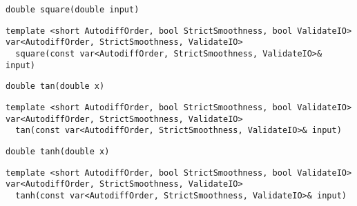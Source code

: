 \begin{tcolorbox}[colback=white,colframe=gray90, coltitle=black,boxrule=3pt,
fonttitle=\bfseries,title= Square]

\begin{verbatim}
double square(double input)

\end{verbatim}

\begin{verbatim}
template <short AutodiffOrder, bool StrictSmoothness, bool ValidateIO>
var<AutodiffOrder, StrictSmoothness, ValidateIO>
  square(const var<AutodiffOrder, StrictSmoothness, ValidateIO>& input)

\end{verbatim}

\end{tcolorbox}

\begin{tcolorbox}[colback=white,colframe=gray90, coltitle=black,boxrule=3pt,
fonttitle=\bfseries,title= Tan]

\begin{verbatim}
double tan(double x)

\end{verbatim}

\begin{verbatim}
template <short AutodiffOrder, bool StrictSmoothness, bool ValidateIO>
var<AutodiffOrder, StrictSmoothness, ValidateIO>
  tan(const var<AutodiffOrder, StrictSmoothness, ValidateIO>& input)

\end{verbatim}

\end{tcolorbox}

\begin{tcolorbox}[colback=white,colframe=gray90, coltitle=black,boxrule=3pt,
fonttitle=\bfseries,title= Tanh]

\begin{verbatim}
double tanh(double x)

\end{verbatim}

\begin{verbatim}
template <short AutodiffOrder, bool StrictSmoothness, bool ValidateIO>
var<AutodiffOrder, StrictSmoothness, ValidateIO>
  tanh(const var<AutodiffOrder, StrictSmoothness, ValidateIO>& input)

\end{verbatim}

\end{tcolorbox}

